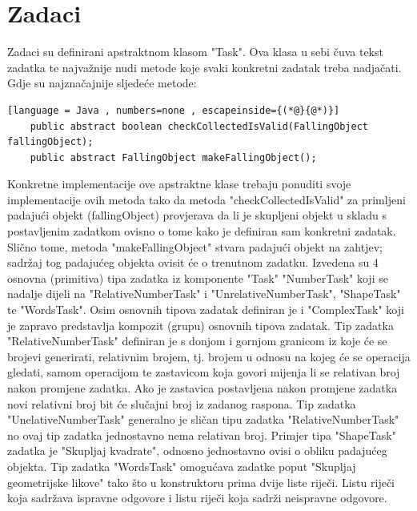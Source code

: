 \documentclass[times, utf8, zavrsni, numeric]{fer}
\begin{document}
	\section{Zadaci}
	Zadaci su definirani apstraktnom klasom "Task". Ova klasa u sebi čuva tekst zadatka te najvažnije nudi metode koje svaki konkretni zadatak treba nadjačati. Gdje su najznačajnije  sljedeće metode:
	\begin{lstlisting}[language = Java , numbers=none , escapeinside={(*@}{@*)}]
	public abstract boolean checkCollectedIsValid(FallingObject fallingObject);
	public abstract FallingObject makeFallingObject();
	\end{lstlisting}
	Konkretne implementacije ove apstraktne klase trebaju ponuditi svoje implementacije
	 ovih metoda tako da metoda "checkCollectedIsValid" za primljeni padajući objekt (fallingObject) provjerava da li je skupljeni objekt u skladu s postavljenim zadatkom ovisno o tome kako je definiran sam konkretni
	 zadatak. Slično tome, metoda "makeFallingObject" stvara padajući objekt na zahtjev;  sadržaj tog padajućeg objekta ovisit će o trenutnom zadatku. Izvedena su 4 osnovna (primitiva) tipa zadatka iz komponente "Task"
	 "NumberTask" koji se nadalje dijeli na "RelativeNumberTask" i "UnrelativeNumberTask", "ShapeTask" te "WordsTask". Osim osnovnih tipova zadatak definiran je i "ComplexTask"  koji je zapravo predstavlja kompozit (grupu)
	 osnovnih tipova zadatak.
	 Tip zadatka "RelativeNumberTask" definiran je s donjom i gornjom granicom iz koje će se brojevi generirati, relativnim brojem, tj. brojem u odnosu na kojeg će se operacija gledati, samom operacijom te
	 zastavicom koja govori mijenja li se relativan broj nakon promjene zadatka. Ako je zastavica postavljena nakon promjene zadatka novi relativni broj bit će slučajni broj iz zadanog raspona. Tip zadatka
	 "UnelativeNumberTask" generalno je sličan tipu zadatka "RelativeNumberTask" no ovaj tip zadatka jednostavno nema relativan broj. Primjer tipa "ShapeTask" zadatka je "Skupljaj kvadrate", odnosno jednostavno ovisi
	 o obliku padajućeg objekta. Tip zadatka "WordsTask" omogućava zadatke poput "Skupljaj geometrijske likove" tako što u konstruktoru prima dvije liste riječi. Listu riječi koja sadržava ispravne odgovore i listu riječi
	 koja sadrži neispravne odgovore. 
	 
\end{document}
